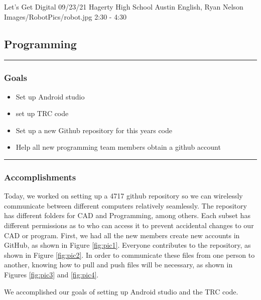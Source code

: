 \insertmeeting 
	{Let's Get Digital} 
	{09/23/21}
	{Hagerty High School}
	{Austin English, Ryan Nelson}
	{Images/RobotPics/robot.jpg}
	{2:30 - 4:30}
	
\subsection*{Programming}
\noindent\hfil\rule{\textwidth}{.4pt}\hfil
\subsubsection*{Goals}
\begin{itemize}
    \item Set up Android studio
    \item set up TRC code   
    \item Set up a new Github repository for this years code
    \item Help all new programming team members obtain a github account 
\end{itemize} 

\noindent\hfil\rule{\textwidth}{.4pt}\hfil

\subsubsection*{Accomplishments}
Today, we worked on setting up a 4717 github repository so we can wirelessly communicate between different computers relatively seamlessly. The repository has different folders for CAD and Programming, among others. Each subset has different permissions as to who can access it to prevent accidental changes to our CAD or program. First, we had all the new members create new accounts in GitHub, as shown in Figure \ref{fig:pic1}. Everyone contributes to the repository, as shown in Figure \ref{fig:pic2}. In order to communicate these files from one person to another, knowing how to pull and push files will be necessary, as shown in Figures \ref{fig:pic3} and \ref{fig:pic4}. 
 
We accomplished our goals of setting up Android studio and the TRC code.
 

